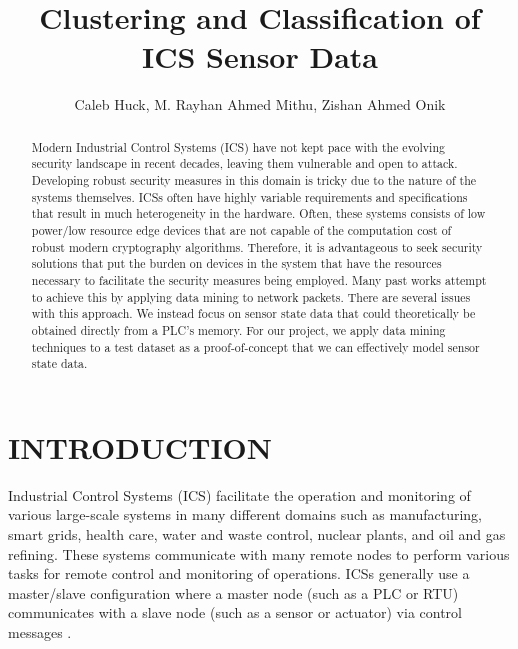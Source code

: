 \documentclass[letterpaper, 10 pt, conference]{ieeeconf}  %
\title{\LARGE \bf
Clustering and Classification of ICS Sensor Data
}
\author{Caleb Huck, M. Rayhan Ahmed Mithu, Zishan Ahmed Onik%
}
\begin{document}
\maketitle
\thispagestyle{empty}
\pagestyle{empty}


\begin{abstract}
Modern Industrial Control Systems (ICS) have not kept pace with the evolving security landscape in recent decades, leaving them vulnerable and open to attack. Developing robust security measures in this domain is tricky due to the nature of the systems themselves. ICSs often have highly variable requirements and specifications that result in much heterogeneity in the hardware. Often, these systems consists of low power/low resource edge devices that are not capable of the computation cost of robust modern cryptography algorithms. Therefore, it is advantageous to seek security solutions that put the burden on devices in the system that have the resources necessary to facilitate the security measures being employed. Many past works attempt to achieve this by applying data mining to network packets. There are several issues with this approach. We instead focus on sensor state data that could theoretically be obtained directly from a PLC's memory. For our project, we apply data mining techniques to a test dataset as a proof-of-concept that we can effectively model sensor state data. 
\end{abstract}

\section{INTRODUCTION}
Industrial Control Systems (ICS) facilitate the operation and monitoring of various large-scale systems in many different domains such as manufacturing, smart grids, health care, water and waste control, nuclear plants, and oil and gas refining. These systems communicate with many remote nodes to perform various tasks for remote control and monitoring of operations. ICSs generally use a master/slave configuration where a master node (such as a PLC or RTU) communicates with a slave node (such as a sensor or actuator) via control messages \cite{igure2006security}.
\end{document}
